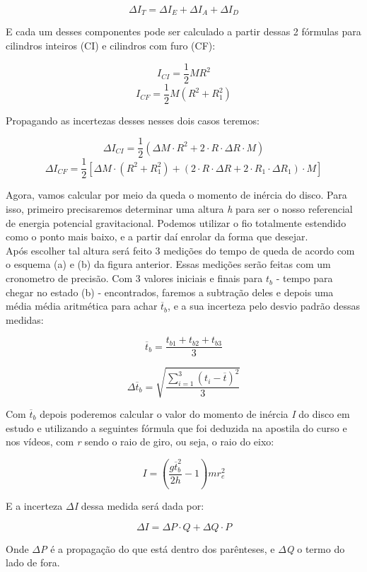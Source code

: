 \[\Delta I_T = \Delta I_E + \Delta I_A + \Delta I_D\]

E cada um desses componentes pode ser calculado a partir dessas 2 fórmulas para cilindros inteiros (CI) e cilindros com furo (CF):

\[I_{CI} = \frac{1}{2}MR^2\]
\[I_{CF} = \frac{1}{2}M(R^2 + R_1^2)\]

Propagando as incertezas desses nesses dois casos teremos:

\[\Delta I_{CI} = \frac{1}{2} \left( \Delta M \cdot R^2 + 2 \cdot R \cdot \Delta R \cdot M \right)\]
\[\Delta I_{CF} = \frac{1}{2} 
    \left[ 
        \Delta M \cdot (R^2 + R_1^2) + 
        \left( 2 \cdot R \cdot \Delta R + 2 \cdot R_1 \cdot \Delta R_1 \right) \cdot M
    \right]
\]

Agora, vamos calcular por meio da queda o momento de inércia do disco. Para isso, primeiro precisaremos determinar uma altura \textit{h} para ser o nosso referencial de energia potencial gravitacional. Podemos utilizar o fio totalmente estendido como o ponto mais baixo, e a partir daí enrolar da forma que desejar.\\

Após escolher tal altura será feito 3 medições do tempo de queda de acordo com o esquema (a) e (b) da figura anterior. Essas medições serão feitas com um cronometro de precisão. Com 3 valores iniciais e finais para \textit{$t_b$} - tempo para chegar no estado (b) - encontrados, faremos a subtração deles e depois uma média média aritmética para achar $\overline{t}_b$, e a sua incerteza pelo desvio padrão dessas medidas:

\[\overline{t}_b = \frac{t_{b1} + t_{b2} + t_{b3}}{3}\]

\[\Delta \overline{t}_b = \sqrt{\frac{\sum_{i=1}^{3} (t_i - \overline{t})^2}{3}}\]

Com $\overline{t}_b$ depois poderemos calcular o valor do momento de inércia \textit{I} do disco em estudo e utilizando a seguintes fórmula que foi deduzida na apostila do curso e nos vídeos, com \textit{r} sendo o raio de giro, ou seja, o raio do eixo:

\[I = \left( \frac{g \overline{t}_b^2}{2h} - 1 \right) mr_e^2\]

E a incerteza \textit{$\Delta$I} dessa medida será dada por:

\[\Delta I = \Delta P \cdot Q + \Delta Q \cdot P\]

Onde \textit{$\Delta$P} é a propagação do que está dentro dos parênteses, e \textit{$\Delta$Q} o termo do lado de fora.

